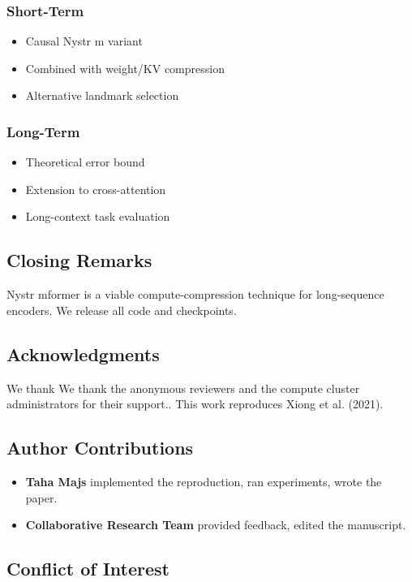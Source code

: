 \subsubsection{Short-Term}
\begin{itemize}
\item Causal Nystr m variant
\item Combined with weight/KV compression
\item Alternative landmark selection

\end{itemize}
\subsubsection{Long-Term}
\begin{itemize}
\item Theoretical error bound
\item Extension to cross-attention
\item Long-context task evaluation

\end{itemize}
\subsection{Closing Remarks}

Nystr mformer is a viable compute-compression technique for long-sequence 
encoders. We release all code and checkpoints.

\subsection{Acknowledgments}

We thank We thank the anonymous reviewers and the compute cluster administrators for their support.. This work reproduces Xiong et al. (2021).

\subsection{Author Contributions}

\begin{itemize}
\item \textbf{Taha Majs} implemented the reproduction, ran experiments, wrote
  the paper.
\item \textbf{Collaborative Research Team} provided feedback, edited the manuscript.

\end{itemize}
\subsection{Conflict of Interest}

